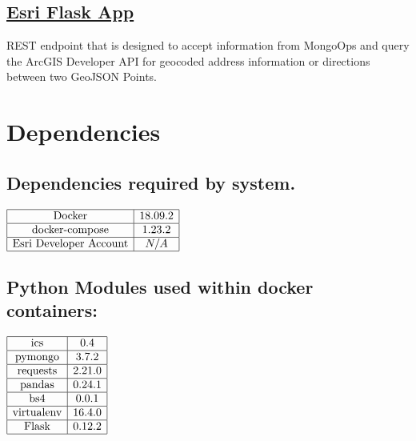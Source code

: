 \subsection{\href{https://github.com/apjansing/Open-House-Route-Planner/blob/master/backend/docker/persistence/esri/esri_flask.py}{Esri Flask App}} \label{Esri Flask App}

REST endpoint that is designed to accept information from MongoOps and query the ArcGIS Developer API for geocoded address information or directions between two GeoJSON Points.
  


\section{Dependencies}
\subsection{Dependencies required by system.}
$
\begin{array}{|c|c|}
  \hline
  \text{Docker} & 18.09.2 \\\hline
  \text{docker-compose} & 1.23.2 \\\hline
  \text{Esri Developer Account} & N/A \\
  \hline
\end{array}
$

\subsection{Python Modules used within docker containers:}
$
\begin{array}{|c|c|}
  \hline
  \text{ics} & 0.4\\\hline
  \text{pymongo} & 3.7.2 \\\hline
  \text{requests} & 2.21.0 \\\hline
  \text{pandas} & 0.24.1 \\\hline
  \text{bs4} & 0.0.1 \\\hline
  \text{virtualenv} & 16.4.0 \\\hline
  \text{Flask} & 0.12.2 \\
  \hline
\end{array}
$